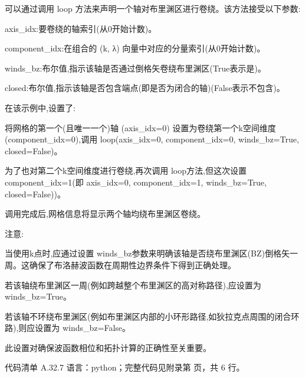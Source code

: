 \documentclass[lang=cn,scheme=chinese,color=blue,device=normal,toc=onecol,math=cm]{elegantbook}
\begin{document}
可以通过调用 loop 方法来声明一个轴对布里渊区进行卷绕。该方法接受以下参数:\par


axis\_\allowbreak{}idx:要卷绕的轴索引(从0开始计数)。\par


component\_\allowbreak{}idx:在组合的 (k, λ) 向量中对应的分量索引(从0开始计数)。\par


winds\_\allowbreak{}bz:布尔值,指示该轴是否通过倒格矢卷绕布里渊区(True表示是)。\par


closed:布尔值,指示该轴是否包含端点(即是否为闭合的轴)(False表示不包含)。\par


在该示例中,设置了:\par


将网格的第一个(且唯一一个)轴 (axis\_\allowbreak{}idx=0) 设置为卷绕第一个k空间维度 (component\_\allowbreak{}idx=0),调用 loop(axis\_\allowbreak{}idx=0, component\_\allowbreak{}idx=0, winds\_\allowbreak{}bz=True, closed=False)。\par


为了也对第二个k空间维度进行卷绕,再次调用 loop方法,但这次设置 component\_\allowbreak{}idx=1(即 axis\_\allowbreak{}idx=0, component\_\allowbreak{}idx=1, winds\_\allowbreak{}bz=True, closed=False))。\par


调用完成后,网格信息将显示两个轴均绕布里渊区卷绕。\par


注意:\par


当使用k点时,应通过设置 winds\_\allowbreak{}bz参数来明确该轴是否绕布里渊区(BZ)倒格矢一周。这确保了布洛赫波函数在周期性边界条件下得到正确处理。\par


若该轴绕布里渊区一周(例如跨越整个布里渊区的高对称路径),应设置为 winds\_\allowbreak{}bz=True。\par


若该轴不环绕布里渊区(例如布里渊区内部的小环形路径,如狄拉克点周围的闭合环路),则应设置为 winds\_\allowbreak{}bz=False。\par


此设置对确保波函数相位和拓扑计算的正确性至关重要。\par


\begin{codeindexbox}{代码清单 A.32.7}
语言：python；完整代码见附录第 \pageref{code:32:7} 页，共 6 行。
\end{codeindexbox}
\end{document}
